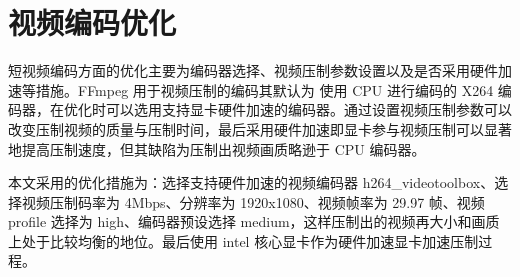 \section{视频编码优化}
短视频编码方面的优化主要为编码器选择、视频压制参数设置以及是否采用硬件加速等措施。FFmpeg 用于视频压制的编码其默认为 使用 CPU 进行编码的 X264 编码器，在优化时可以选用支持显卡硬件加速的编码器。通过设置视频压制参数可以改变压制视频的质量与压制时间，最后采用硬件加速即显卡参与视频压制可以显著地提高压制速度，但其缺陷为压制出视频画质略逊于 CPU 编码器。

本文采用的优化措施为：选择支持硬件加速的视频编码器 h264\_videotoolbox、选择视频压制码率为 4Mbps、分辨率为 1920x1080、视频帧率为 29.97 帧、视频 profile 选择为 high、编码器预设选择 medium，这样压制出的视频再大小和画质上处于比较均衡的地位。最后使用 intel 核心显卡作为硬件加速显卡加速压制过程。